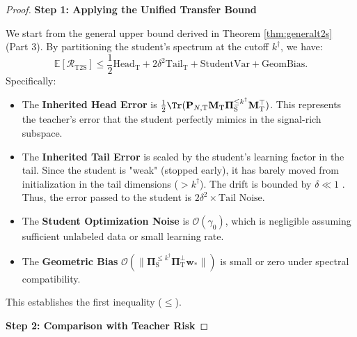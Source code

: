\documentclass{article}
\theoremstyle{definition}
\theoremstyle{definition}
\theoremstyle{plain}
\theoremstyle{plain}
\theoremstyle{plain}
\theoremstyle{plain}
\theoremstyle{plain}
\newcommand{\bs}[1]{\boldsymbol{\mathbf{#1}}}
\newcommand{\Ex}{\mathbb{E}}
\newcommand{\te}{\mathrm{T}}
\newcommand{\st}{\mathrm{S}}
\newcommand{\M}{\mathbf{M}}
\newcommand{\w}{\mathbf{w}}
\begin{document}
\begin{proof}
    \textbf{Step 1: Applying the Unified Transfer Bound}
    
    We start from the general upper bound derived in Theorem \ref{thm:generalt2s} (Part 3). By partitioning the student's spectrum at the cutoff $k^\dagger$, we have:
    \begin{equation}
        \Ex[\mathcal{R}_{\mathrm{T2S}}] \leq \frac{1}{2}\text{Head}_{\te} + 2\delta^2 \text{Tail}_{\te} + \text{StudentVar} + \text{GeomBias}.
    \end{equation}
    Specifically:
    \begin{itemize}
        \item The \textbf{Inherited Head Error} is $\frac{1}{2}\Tr(\bs P_{N,\te} \M_\te \bs \Pi_\st^{\le k^\dagger} \M_\te^\top)$. This represents the teacher's error that the student perfectly mimics in the signal-rich subspace.
        \item The \textbf{Inherited Tail Error} is scaled by the student's learning factor in the tail. Since the student is "weak" (stopped early), it has barely moved from initialization in the tail dimensions ($> k^\dagger$). The drift is bounded by $\delta \ll 1$ . Thus, the error passed to the student is $2\delta^2 \times \text{Tail Noise}$.
        \item The \textbf{Student Optimization Noise} is $\mathcal{O}(\gamma_0)$, which is negligible assuming sufficient unlabeled data or small learning rate.
        \item The \textbf{Geometric Bias} $\mathcal{O}(\|\bs \Pi_{\st}^{\leq k^\dagger}\bs \Pi_{\te}^{\perp}\w_{*}\|)$ is small or zero under spectral compatibility.
    \end{itemize}
    This establishes the first inequality ($\leq$).

    \textbf{Step 2: Comparison with Teacher Risk}
    

\end{proof}
\end{document}
